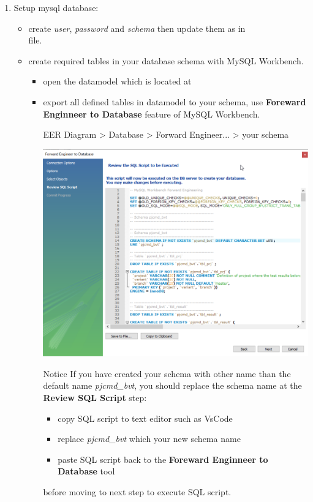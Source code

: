 \begin{enumerate}
\item Setup mysql database:
\begin{itemize}
\item create \emph{user}, \emph{password} and \emph{schema} then update them  
      as  in  \\
       file.
\item create required tables in your database schema with MySQL Workbench.
\begin{itemize}
\item open the datamodel which is located at
\item export all defined tables in datamodel to your schema, use 
      \textbf{Foreward Enginneer to Database} feature of MySQL Workbench.
\begin{robotlog}
EER Diagram > Database > Forward Engineer... > your schema
\end{robotlog}
\includegraphics[width=1\linewidth]{./pictures/forward_engineer.png}
\begin{boxhint}{Notice}
If you have created your schema with other name than the default 
name \emph{pjcmd\_bvt}, you should replace the schema name at the \textbf{Review
SQL Script} step:
\begin{itemize}
\item copy SQL script to text editor such as VsCode
\item replace \emph{pjcmd\_bvt} which your new schema name
\item paste SQL script back to the \textbf{Foreward Enginneer to Database} 
      tool
\end{itemize}
before moving to next step to execute SQL script.
\end{boxhint}


\end{itemize}
\end{itemize}
\end{enumerate}
